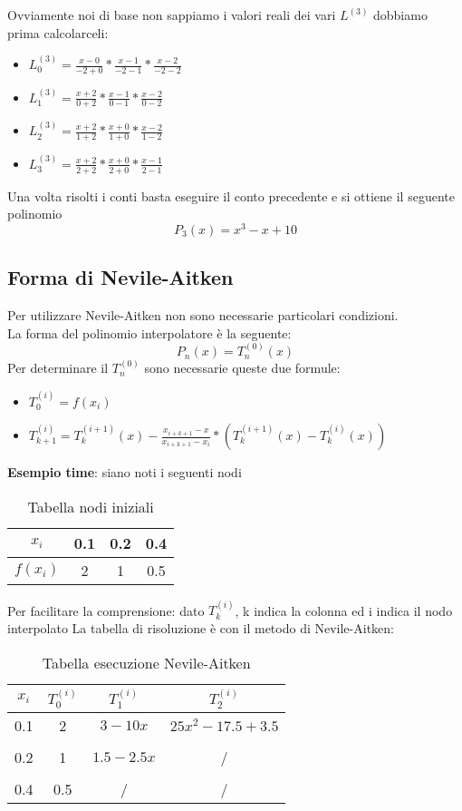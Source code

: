 Ovviamente noi di base non sappiamo i valori reali dei vari $L^{(3)}$ dobbiamo prima calcolarceli:
\begin{itemize}
\item $L^{(3)}_0 = \frac{x-0}{-2+0} * \frac{x-1}{-2-1} * \frac{x-2}{-2-2}$ 
\item $L^{(3)}_1 = \frac{x+2}{0+2} * \frac{x-1}{0-1} * \frac{x-2}{0-2}$
\item $L^{(3)}_2 = \frac{x+2}{1+2} * \frac{x+0}{1+0} * \frac{x-2}{1-2}$
\item $L^{(3)}_3 = \frac{x+2}{2+2} * \frac{x+0}{2+0} * \frac{x-1}{2-1}$
\end{itemize}
\noindent
Una volta risolti i conti basta eseguire il conto precedente e si ottiene il seguente polinomio $$P_3(x) = x^3-x+10$$

\subsection{Forma di Nevile-Aitken}
\label{Forma di Nevile-Aitken}
Per utilizzare Nevile-Aitken non sono necessarie particolari condizioni.\\
La forma del polinomio interpolatore è la seguente: $$P_n(x) = T_n^{(0)}(x)$$
Per determinare il $T_n^{(0)}$ sono necessarie queste due formule:
\begin{itemize}
\item $T_0^{(i)} = f(x_i)$
\item $T_{k+1}^{(i)} = T_k^{(i+1)}(x) - \frac{x_{i+k+1}-x}{x_{i+k+1}-x_i} * (T_k^{(i+1)}(x) - T_k^{(i)}(x))$
\end{itemize}
\newpage
\textbf{Esempio time}: siano noti i seguenti nodi
\begin{table}[!h]
\centering
\begin{tabular}{|c|c c c }
$x_i$ & 0.1 & 0.2 & 0.4 \\
\hline
$f(x_i)$ & 2 & 1 & 0.5
\end{tabular}
\caption{Tabella nodi iniziali}
\end{table}


Per facilitare la comprensione: dato $T_k^{(i)}$, k indica la colonna ed i indica il nodo interpolato
La tabella di risoluzione è con il metodo di Nevile-Aitken:

\begin{table}[!h]
\centering
\begin{tabular}{|c|c|c|c|}
$x_i$ & $T_0^{(i)}$ & $T_1^{(i)}$ & $T_2^{(i)}$ \\ 
\hline
0.1 & 2 & $3-10x$ & $25x^2-17.5+3.5$ \\
& & & \\
0.2 & 1 & $1.5-2.5x$& / \\
& & & \\
0.4 & 0.5 & / & /
\end{tabular}
\caption{Tabella esecuzione Nevile-Aitken}
\end{table}


